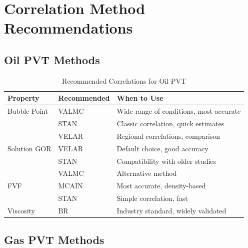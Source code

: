 \documentclass[11pt,a4paper]{article}
\begin{document}
\newpage

\section{Correlation Method Recommendations}

\subsection{Oil PVT Methods}

\begin{table}[h]
\centering
\begin{tabular}{llp{7cm}}
\toprule
\textbf{Property} & \textbf{Recommended} & \textbf{When to Use} \\
\midrule
Bubble Point & VALMC & Wide range of conditions, most accurate \\
 & STAN & Classic correlation, quick estimates \\
 & VELAR & Regional correlations, comparison \\
\midrule
Solution GOR & VELAR & Default choice, good accuracy \\
 & STAN & Compatibility with older studies \\
 & VALMC & Alternative method \\
\midrule
FVF & MCAIN & Most accurate, density-based \\
 & STAN & Simple correlation, fast \\
\midrule
Viscosity & BR & Industry standard, widely validated \\
\bottomrule
\end{tabular}
\caption{Recommended Correlations for Oil PVT}
\end{table}

\subsection{Gas PVT Methods}
\end{document}
